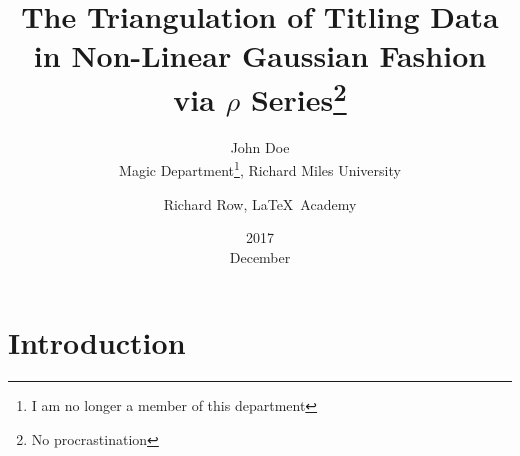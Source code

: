 \documentclass{article}%
\title{The Triangulation of Titling Data in Non-Linear Gaussian Fashion via $\rho$ Series\thanks{No procrastination}}
\date{2017\\ December}
\author{John Doe\\ Magic Department\thanks{I am no longer a member of this department}, Richard Miles University
\and Richard Row, \LaTeX\ Academy}
\begin{document}
\maketitle
\section{Introduction}
\blindtext
\end{document}
